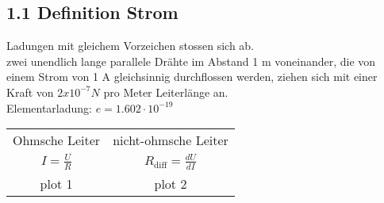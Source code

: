 \subsection*{1.1 Definition Strom}

Ladungen mit gleichem Vorzeichen stossen sich ab.\\
zwei unendlich lange parallele Drähte im Abstand 1 m voneinander, die von einem Strom von 1 A gleichsinnig durchflossen werden, ziehen sich mit einer Kraft von $2x10^{-7} N$ pro Meter Leiterlänge an.\\
Elementarladung: $e = 1.602 \cdot 10^{-19}$



\begin{tabular}{c c}
    Ohmsche Leiter & nicht-ohmsche Leiter \\
    $I = \frac{U}{R}$ & $R_{\text{diff}} = \frac{dU}{dI}$\\
    plot 1 & plot 2
\end{tabular}

